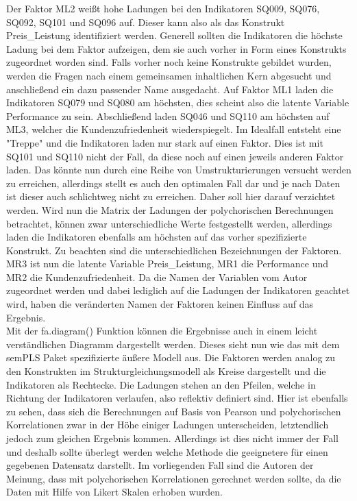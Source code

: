 \documentclass{article}\usepackage[]{graphicx}\usepackage[]{color}
\begin{document}
Der Faktor ML2 weißt hohe Ladungen bei den Indikatoren SQ009, SQ076, SQ092, SQ101 und SQ096 auf. Dieser kann also als das Konstrukt Preis\_Leistung identifiziert werden. Generell sollten die Indikatoren die höchste Ladung bei dem Faktor aufzeigen, dem sie auch vorher in Form eines Konstrukts zugeordnet worden sind. Falls vorher noch keine Konstrukte gebildet wurden, werden die Fragen nach einem gemeinsamen inhaltlichen Kern abgesucht und anschließend ein dazu passender Name ausgedacht. Auf Faktor ML1 laden die Indikatoren SQ079 und SQ080 am höchsten, dies scheint also die latente Variable Performance zu sein. Abschließend laden SQ046 und SQ110 am höchsten auf ML3, welcher die Kundenzufriedenheit wiederspiegelt. Im Idealfall entsteht eine "Treppe" und die Indikatoren laden nur stark auf einen Faktor. Dies ist mit SQ101 und SQ110 nicht der Fall, da diese noch auf einen jeweils anderen Faktor laden. Das könnte nun durch eine Reihe von Umstrukturierungen versucht werden zu erreichen, allerdings stellt es auch den optimalen Fall dar und je nach Daten ist dieser auch schlichtweg nicht zu erreichen. Daher soll hier darauf verzichtet werden. Wird nun die Matrix der Ladungen der polychorischen Berechnungen betrachtet, können zwar unterschiedliche Werte festgestellt werden, allerdings laden die Indikatoren ebenfalls am höchsten auf das vorher spezifizierte Konstrukt. Zu beachten sind die unterschiedlichen Bezeichnungen der Faktoren. MR3 ist nun die latente Variable Preis\_Leistung, MR1 die Performance und MR2 die Kundenzufriedenheit. Da die Namen der Variablen vom Autor zugeordnet werden und dabei lediglich auf die Ladungen der Indikatoren geachtet wird, haben die veränderten Namen der Faktoren keinen Einfluss auf das Ergebnis.\\
Mit der fa.diagram() Funktion können die Ergebnisse auch in einem leicht verständlichen Diagramm dargestellt werden. Dieses sieht nun wie das mit dem semPLS Paket spezifizierte äußere Modell aus. Die Faktoren werden analog zu den Konstrukten im Strukturgleichungsmodell als Kreise dargestellt und die Indikatoren als Rechtecke. Die Ladungen stehen an den Pfeilen, welche in Richtung der Indikatoren verlaufen, also reflektiv definiert sind. Hier ist ebenfalls zu sehen, dass sich die Berechnungen auf Basis von Pearson und polychorischen Korrelationen zwar in der Höhe einiger Ladungen unterscheiden, letztendlich jedoch zum gleichen Ergebnis kommen. Allerdings ist dies nicht immer der Fall und deshalb sollte überlegt werden welche Methode die geeignetere für einen gegebenen Datensatz darstellt. Im vorliegenden Fall sind die Autoren der Meinung, dass mit polychorischen Korrelationen gerechnet werden sollte, da die Daten mit Hilfe von Likert Skalen erhoben wurden.
\end{document}
